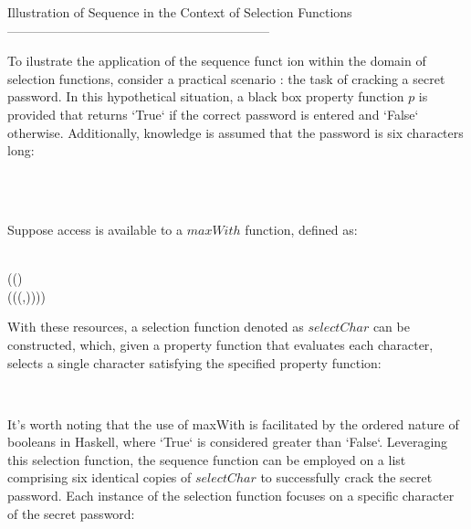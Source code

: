 Illustration of Sequence in the Context of Selection Functions
--------------------------------------------------------------

To ilustrate the application of the sequence funct ion within the domain of selection 
functions, consider a practical scenario \cite{hartmann2022algorithm}: the task of 
cracking a secret password. In this hypothetical situation, a black box property function 
$p$ is provided that returns `True` if the correct password is entered and `False` 
otherwise. Additionally, knowledge is assumed that the password is six characters long:
\begin{hscode}\SaveRestoreHook
{}%
%
%
%
\>[3]{}\mathbin{::}\to {}\<[E]%
\\
\>[3]{}\;\mathrel{=}\<[E]%
\\
\>[3]{}\;\anonymous {}\<[14]%
\>[14]{}\mathrel{=}\<[E]%
\ColumnHook
\end{hscode}\resethooks
Suppose access is available to a $maxWith$ function, defined as:
\begin{hscode}\SaveRestoreHook
{}%
%
%
%
\>[3]{}\mathbin{::}\;\to {}\;\;\<[E]%
\\
\>[3]{}\;\;\mathrel{=}\;(\;()\;{}\<[E]%
\\
\>[3]{}\<[33]%
\>[33]{}(\;(\lambda {}\to (\;,))\;)){}\<[E]%
\ColumnHook
\end{hscode}\resethooks
With these resources, a selection function denoted as $selectChar$ can be constructed, 
which, given a property function that evaluates each character, selects a single character 
satisfying the specified property function:
\begin{hscode}\SaveRestoreHook
{}%
%
%
\>[3]{}\mathbin{::}\;\;\<[E]%
\\
\>[3]{}\mathrel{=}\<[E]%
\ColumnHook
\end{hscode}\resethooks
It's worth noting that the use of maxWith is facilitated by the ordered nature of booleans
in Haskell, where `True` is considered greater than `False`. Leveraging this selection 
function, the sequence function can be employed on a list comprising six identical copies 
of $selectChar$ to successfully crack the secret password. Each instance of the selection 
function focuses on a specific character of the secret password:

